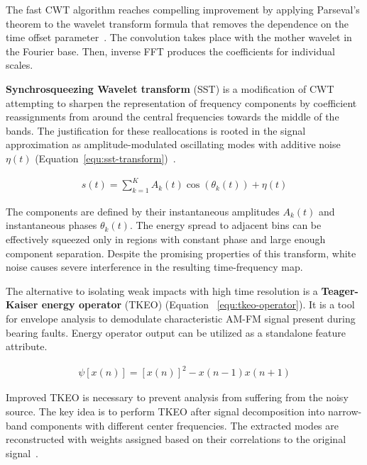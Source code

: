 The fast CWT algorithm reaches compelling improvement by applying Parseval's theorem to the wavelet transform formula that removes the dependence on the time offset parameter~\cite{arts_fast_2022}. The convolution takes place with the mother wavelet in the Fourier base. Then, inverse FFT produces the coefficients for individual scales.

\textbf{Synchrosqueezing Wavelet transform} (SST) is a modification of CWT attempting to sharpen the representation of frequency components by coefficient reassignments from around the central frequencies towards the middle of the bands. The justification for these reallocations is rooted in the signal approximation as amplitude-modulated oscillating modes with additive noise $\eta(t)$ (Equation~\ref{equ:sst-transform})~\cite{herrera_applications_2014}.

\begin{ceqn}\begin{align}
s(t) = \sum_{k=1}^{K} A_k(t)\cos(\theta_k(t)) + \eta(t)
\label{equ:sst-transform}
\end{align}\end{ceqn}

The components are defined by their instantaneous amplitudes $A_k(t)$ and instantaneous phases $\theta_k(t)$. The energy spread to adjacent bins can be effectively squeezed only in regions with constant phase and large enough component separation. Despite the promising properties of this transform, white noise causes severe interference in the resulting time-frequency map.

The alternative to isolating weak impacts with high time resolution is a \textbf{Teager-Kaiser energy operator} (TKEO) (Equation~ \ref{equ:tkeo-operator}). It is a tool for envelope analysis to demodulate characteristic AM-FM signal present during bearing faults. Energy operator output can be utilized as a standalone feature attribute.

\begin{ceqn}\begin{align}
\psi[x(n)] = [x(n)]^2 - x(n - 1)x(n + 1)
\label{equ:tkeo-operator}
\end{align}\end{ceqn}

Improved TKEO is necessary to prevent analysis from suffering from the noisy source. The key idea is to perform TKEO after signal decomposition into narrow-band components with different center frequencies. The extracted modes are reconstructed with weights assigned based on their correlations to the original signal~\cite{shi_application_2022}.

